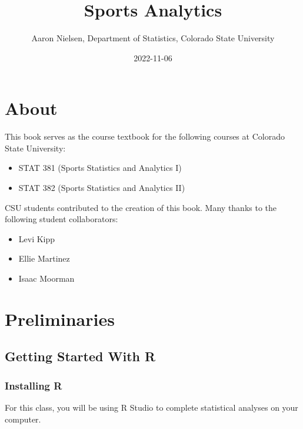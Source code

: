 \documentclass[
  11pt,
]{book}
\title{Sports Analytics}
\author{Aaron Nielsen, Department of Statistics, Colorado State University}
\date{2022-11-06}
\theoremstyle{definition}
\theoremstyle{definition}
\theoremstyle{definition}
\theoremstyle{definition}
\theoremstyle{remark}
\begin{document}
\maketitle

{
\setcounter{tocdepth}{1}
\tableofcontents
}
\hypertarget{about}{%
\chapter*{About}\label{about}}

This book serves as the course textbook for the following courses at Colorado State University:

\begin{itemize}
\item
  STAT 381 (Sports Statistics and Analytics I)
\item
  STAT 382 (Sports Statistics and Analytics II)
\end{itemize}

\hfill\break

CSU students contributed to the creation of this book. Many thanks to the following student collaborators:

\begin{itemize}
\item
  Levi Kipp
\item
  Ellie Martinez
\item
  Isaac Moorman
\end{itemize}

\hypertarget{preliminaries}{%
\chapter*{Preliminaries}\label{preliminaries}}

\hypertarget{getting-started-with-r}{%
\section*{Getting Started With R}\label{getting-started-with-r}}

\hypertarget{installing-r}{%
\subsection*{Installing R}\label{installing-r}}

For this class, you will be using R Studio to complete statistical analyses on your computer.
\end{document}
